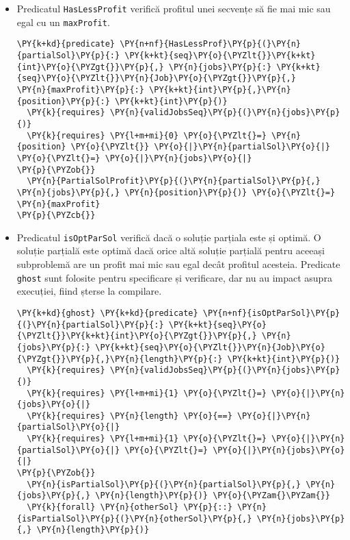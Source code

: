 \begin{itemize}
    \item Predicatul \texttt{HasLessProfit} verifică profitul unei secvențe să fie mai mic sau egal cu un \texttt{maxProfit}. 
    \begin{Verbatim}[commandchars=\\\{\}, fontsize=\footnotesize]
\PY{k+kd}{predicate} \PY{n+nf}{HasLessProf}\PY{p}{(}\PY{n}{partialSol}\PY{p}{:} \PY{k+kt}{seq}\PY{o}{\PYZlt{}}\PY{k+kt}{int}\PY{o}{\PYZgt{}}\PY{p}{,} \PY{n}{jobs}\PY{p}{:} \PY{k+kt}{seq}\PY{o}{\PYZlt{}}\PY{n}{Job}\PY{o}{\PYZgt{}}\PY{p}{,}  
\PY{n}{maxProfit}\PY{p}{:} \PY{k+kt}{int}\PY{p}{,}\PY{n}{position}\PY{p}{:} \PY{k+kt}{int}\PY{p}{)}
  \PY{k}{requires} \PY{n}{validJobsSeq}\PY{p}{(}\PY{n}{jobs}\PY{p}{)}
  \PY{k}{requires} \PY{l+m+mi}{0} \PY{o}{\PYZlt{}=} \PY{n}{position} \PY{o}{\PYZlt{}} \PY{o}{|}\PY{n}{partialSol}\PY{o}{|} \PY{o}{\PYZlt{}=} \PY{o}{|}\PY{n}{jobs}\PY{o}{|}
\PY{p}{\PYZob{}}
  \PY{n}{PartialSolProfit}\PY{p}{(}\PY{n}{partialSol}\PY{p}{,} \PY{n}{jobs}\PY{p}{,} \PY{n}{position}\PY{p}{)} \PY{o}{\PYZlt{}=} \PY{n}{maxProfit}
\PY{p}{\PYZcb{}}
\end{Verbatim}
    \item Predicatul \texttt{isOptParSol} verifică dacă o soluție parțiala este și optimă. O soluție parțială este optimă dacă orice altă soluție parțială pentru aceeași subproblemă are un profit mai mic sau egal decât profitul acesteia. Predicate \texttt{ghost} sunt folosite pentru specificare și verificare, dar nu au impact asupra execuției, fiind șterse la compilare. 
    \begin{Verbatim}[commandchars=\\\{\}, fontsize=\footnotesize]
\PY{k+kd}{ghost} \PY{k+kd}{predicate} \PY{n+nf}{isOptParSol}\PY{p}{(}\PY{n}{partialSol}\PY{p}{:} \PY{k+kt}{seq}\PY{o}{\PYZlt{}}\PY{k+kt}{int}\PY{o}{\PYZgt{}}\PY{p}{,} \PY{n}{jobs}\PY{p}{:} \PY{k+kt}{seq}\PY{o}{\PYZlt{}}\PY{n}{Job}\PY{o}{\PYZgt{}}\PY{p}{,}\PY{n}{length}\PY{p}{:} \PY{k+kt}{int}\PY{p}{)}
  \PY{k}{requires} \PY{n}{validJobsSeq}\PY{p}{(}\PY{n}{jobs}\PY{p}{)}
  \PY{k}{requires} \PY{l+m+mi}{1} \PY{o}{\PYZlt{}=} \PY{o}{|}\PY{n}{jobs}\PY{o}{|} 
  \PY{k}{requires} \PY{n}{length} \PY{o}{==} \PY{o}{|}\PY{n}{partialSol}\PY{o}{|}
  \PY{k}{requires} \PY{l+m+mi}{1} \PY{o}{\PYZlt{}=} \PY{o}{|}\PY{n}{partialSol}\PY{o}{|} \PY{o}{\PYZlt{}=} \PY{o}{|}\PY{n}{jobs}\PY{o}{|}
\PY{p}{\PYZob{}}
  \PY{n}{isPartialSol}\PY{p}{(}\PY{n}{partialSol}\PY{p}{,} \PY{n}{jobs}\PY{p}{,} \PY{n}{length}\PY{p}{)} \PY{o}{\PYZam{}\PYZam{}}
  \PY{k}{forall} \PY{n}{otherSol} \PY{p}{::} \PY{n}{isPartialSol}\PY{p}{(}\PY{n}{otherSol}\PY{p}{,} \PY{n}{jobs}\PY{p}{,} \PY{n}{length}\PY{p}{)}

\end{Verbatim}
\end{itemize}

